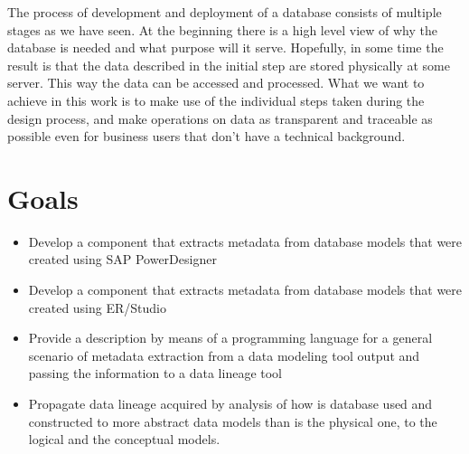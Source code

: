 \par
The process of development and deployment of a database consists of multiple stages as we have seen. At the beginning there is a high level view of why the database is needed and what purpose will it serve. Hopefully, in some time the result is that the data described in the initial step are stored physically at some server. 
This way the data can be accessed and processed. 
What we want to achieve in this work is to make use of the individual steps taken during the design process, and make operations on data as transparent and traceable as possible even for business users that don't have a technical background.

\section{Goals}

\begin{itemize}
	\item Develop a component that extracts metadata from database models that were created using SAP PowerDesigner 
	\item Develop a component that extracts metadata from database models that were created using ER/Studio
	\item Provide a description by means of a programming language for a general scenario of metadata extraction from a data modeling tool output and passing the information to a data lineage tool
	\item Propagate data lineage acquired by analysis of how is database used and constructed to more abstract data models than is the physical one, to the logical and the conceptual models.
\end{itemize}


